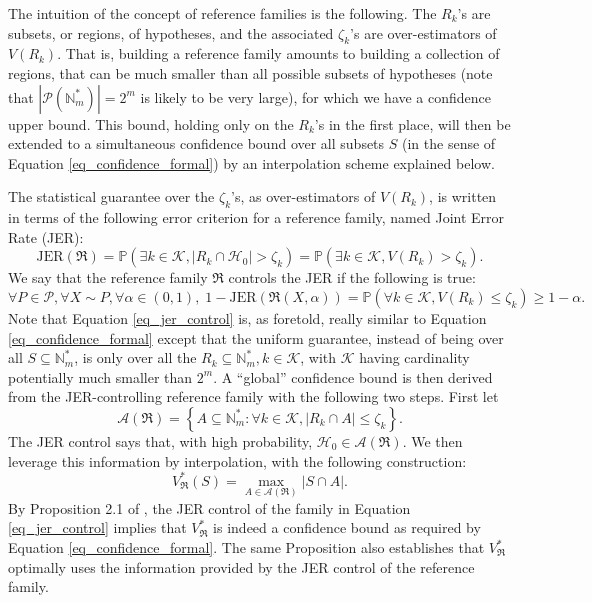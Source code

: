 \documentclass[
  11pt,
  a4paper,
]{article}
\theoremstyle{plain}
\theoremstyle{plain}
\theoremstyle{definition}
\theoremstyle{plain}
\theoremstyle{definition}
\theoremstyle{remark}
\begin{document}
The intuition of the concept of reference families is the following. The
\(R_k\)'s are subsets, or regions, of hypotheses, and the associated
\(\zeta_k\)'s are over-estimators of \(V(R_k)\). That is, building a
reference family amounts to building a collection of regions, that can
be much smaller than all possible subsets of hypotheses (note that
\(\left|\mathcal P(\mathbb{N}_m^*)\right|=2^m\) is likely to be very
large), for which we have a confidence upper bound. This bound, holding
only on the \(R_k\)'s in the first place, will then be extended to a
simultaneous confidence bound over all subsets \(S\) (in the sense of
Equation \eqref{eq_confidence_formal}) by an interpolation scheme
explained below.

The statistical guarantee over the \(\zeta_k\)'s, as over-estimators of
\(V(R_k)\), is written in terms of the following error criterion for a
reference family, named Joint Error Rate (JER): \begin{equation}
\mathrm{JER}(\mathfrak{R}) = \mathbb{P}\left(\exists k\in\mathcal K, |R_k\cap\mathcal{H}_0| > \zeta_k \right) = \mathbb{P}\left(\exists k\in\mathcal K, V(R_k) > \zeta_k \right).
\label{eq_jer}
\end{equation} We say that the reference family \(\mathfrak{R}\)
controls the JER if the following is true: \begin{equation}
\forall P\in\mathcal P, \forall X\sim P, \forall \alpha \in (0,1),\; 1-\mathrm{JER}(\mathfrak{R}(X,\alpha))=\mathbb{P}\left(\forall k\in\mathcal K, V(R_k)\leq \zeta_k\right) \geq 1-\alpha.
\label{eq_jer_control}
\end{equation} Note that Equation \eqref{eq_jer_control} is, as
foretold, really similar to Equation \eqref{eq_confidence_formal} except
that the uniform guarantee, instead of being over all
\(S\subseteq \mathbb{N}_m^*\), is only over all the
\(R_k\subseteq \mathbb{N}_m^*, k\in\mathcal K\), with \(\mathcal K\)
having cardinality potentially much smaller than \(2^m\). A ``global''
confidence bound is then derived from the JER-controlling reference
family with the following two steps. First let \begin{equation}
\mathcal A(\mathfrak{R})= \left\{A\subseteq \mathbb{N}_m^*:  \forall k\in\mathcal K, |R_k\cap A| \leq \zeta_k \right\}.
\label{eq_a}
\end{equation} The JER control says that, with high probability,
\(\mathcal{H}_0\in\mathcal A(\mathfrak{R})\). We then leverage this
information by interpolation, with the following construction:
\begin{equation}
V^*_{\mathfrak{R}}(S) = \max_{A\in\mathcal A(\mathfrak{R})}|S\cap A|.
\label{eq-vstar}
\end{equation} By Proposition 2.1 of \citet{MR4124323}, the JER control
of the family in Equation \eqref{eq_jer_control} implies that
\(V^*_{\mathfrak{R}}\) is indeed a confidence bound as required by
Equation \eqref{eq_confidence_formal}. The same Proposition also
establishes that \(V^*_{\mathfrak{R}}\) optimally uses the information
provided by the JER control of the reference family.
\end{document}
